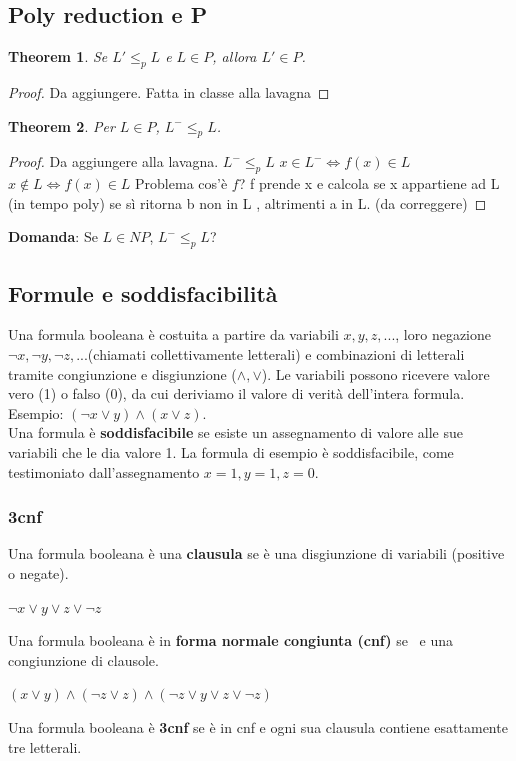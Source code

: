 \documentclass[a4paper, 12pt]{article}
\newtheorem{theorem}{Theorem}[section]
\begin{document}
\subsection{Poly reduction e P}
\begin{theorem}
Se $L' \leq_p L$ e $L \in P$, allora $L' \in P$.
\end{theorem}
\begin{proof}
Da aggiungere. Fatta in classe alla lavagna
\end{proof}
\begin{theorem}
Per $L \in P$, $L^{-} \leq_p L$. 
\end{theorem}
\begin{proof}
Da aggiungere alla lavagna.
$L^{-} \leq_p L$
$x \in L^{-} \iff f(x) \in L$
$x \notin L \iff f(x) \in L$
Problema cos'\`e $f$?
f prende x e calcola se x appartiene ad L (in tempo poly) se s\`i ritorna b non in L , altrimenti a in L. (da correggere)
\end{proof}
\textbf{Domanda}: Se $L \in NP$, $L^{-} \leq_p L$?
\subsection{Formule e soddisfacibilit\`a}
Una formula booleana \`e costuita a partire da variabili $x,y,z,...$, loro negazione $\lnot x, \lnot y, \lnot z,...$(chiamati collettivamente letterali) e combinazioni di letterali tramite congiunzione e disgiunzione ($\land, \lor $). Le variabili possono ricevere valore vero (1) o falso (0), da cui deriviamo il valore di verit\`a dell'intera formula.\\
Esempio: $(\lnot x \lor y) \land (x \lor z)$.\\
Una formula \`e \textbf{soddisfacibile} se esiste un assegnamento di valore alle sue variabili che le dia valore 1. La formula di esempio \`e soddisfacibile, come testimoniato dall'assegnamento $x=1,y=1,z=0$.
\subsubsection{3cnf}
Una formula booleana \`e una \textbf{clausula} se \`e una disgiunzione di variabili (positive o negate).
\begin{center}
$\lnot x \lor y \lor z \lor \lnot z$
\end{center}
Una formula booleana \`e in \textbf{forma normale congiunta (cnf)} se \	e una congiunzione di clausole.
\begin{center}
$(x \lor y) \land (\lnot z \lor z) \land (\lnot z \lor y \lor z \lor \lnot z)$
\end{center}
Una formula booleana \`e \textbf{3cnf} se \`e in cnf e ogni sua clausula contiene esattamente tre letterali.
\end{document}
